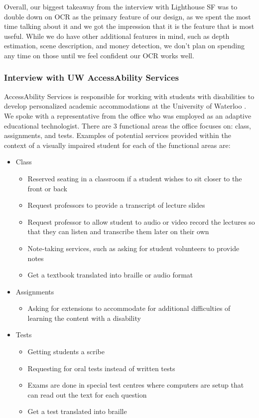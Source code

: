 \documentclass[a4paper,11pt]{article}
\begin{document}
Overall, our biggest takeaway from the interview with Lighthouse SF was to double down on OCR as the primary feature of our design, as we spent the most time talking about it and we got the impression that it is the feature that is most useful. While we do have other additional features in mind, such as depth estimation, scene description, and money detection, we don't plan on spending any time on those until we feel confident our OCR works well.

\subsubsection{Interview with UW AccessAbility Services}
AccessAbility Services is responsible for working with students with disabilities to develop personalized academic accommodations at the University of Waterloo \cite{uw-accessability}. We spoke with a representative from the office who was employed as an adaptive educational technologist. There are 3 functional areas the office focuses on: class, assignments, and tests. Examples of potential services provided within the context of a visually impaired student for each of the functional areas are:
\begin{itemize}
    \item Class
    \begin{itemize}
        \item Reserved seating in a classroom if a student wishes to sit closer to the front or back
        \item Request professors to provide a transcript of lecture slides
        \item Request professor to allow student to audio or video record the lectures so that they can listen and transcribe them later on their own
        \item Note-taking services, such as asking for student volunteers to provide notes
        \item Get a textbook translated into braille or audio format
    \end{itemize}
    
    \item Assignments
    \begin{itemize}
        \item Asking for extensions to accommodate for additional difficulties of learning the content with a disability
    \end{itemize}
    
    \item Tests
    \begin{itemize}
        \item Getting students a scribe
        \item Requesting for oral tests instead of written tests
        \item Exams are done in special test centres where computers are setup that can read out the text for each question
        \item Get a test translated into braille
    \end{itemize}
\end{itemize}
\end{document}

